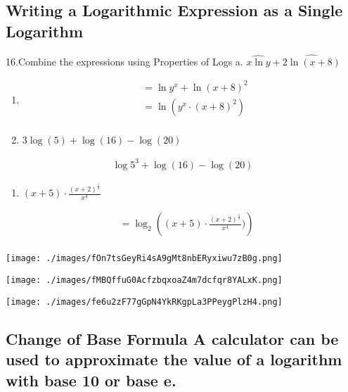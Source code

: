 \documentclass{book}
\begin{document}
\subsection{Writing a Logarithmic Expression as a Single
	Logarithm}\label{writing-a-logarithmic-expression-as-a-single-logarithm}

16.Combine the expressions using Properties of Logs a.
\(\widehat{x\ln y}+\widehat{2\ln(x+8)}\)

\begin{enumerate}
	\def\labelenumi{\alph{enumi}.}
	\item
	      
		      \begin{align}
			       & = \ln y^x + \ln (x+8)^2 \\&= \ln (y^x \cdot (x+8)^2) \\
		      \end{align}
	      
	\item
	      \(3 \log (5) + \log (16) - \log(20)\)
\end{enumerate}


	\begin{align}
		\log5^3 + \log (16) - \log(20)
	\end{align}


\begin{enumerate}
	\def\labelenumi{\alph{enumi}.}
	\setcounter{enumi}{2}
	\tightlist
	\item
	      \((x+5) \cdot \frac{(x+2)^\frac{1}{3}}{x^4}\)
\end{enumerate}


	\begin{align}
		 & = \log_2 \left ( (x+5) \cdot \frac{(x+2)^\frac{1}{3}}{x^4}) \right ) \\
	\end{align}


\texttt{[image: ./images/fOn7tsGeyRi4sA9gMt8nbERyxiwu7zB0g.png]}

\texttt{[image: ./images/fMBQffuG0AcfzbqxoaZ4m7dcfqr8YALxK.png]}

\texttt{[image: ./images/fe6u2zF77gGpN4YkRKgpLa3PPeygPlzH4.png]}

\subsection{Change of Base Formula A calculator can be used to
	approximate the value of a logarithm with base 10 or base
	e.}\label{change-of-base-formula-a-calculator-can-be-used-to-approximate-the-value-of-a-logarithm-with-base-10-or-base-e.}
\end{document}
